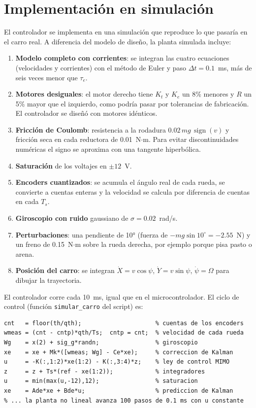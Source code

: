 \documentclass[11pt,letterpaper]{article}
\begin{document}
\section{Implementación en simulación}
\label{sec:implementacion}
El controlador se implementa en una simulación que reproduce lo que pasaría en el carro real. A diferencia del modelo de diseño, la planta simulada incluye:
\begin{enumerate}
  \item \textbf{Modelo completo con corrientes}: se integran las cuatro ecuaciones (velocidades y corrientes) con el método de Euler y paso $\Delta t = 0.1$~ms, más de seis veces menor que $\tau_e$.
  \item \textbf{Motores desiguales}: el motor derecho tiene $K_t$ y $K_e$ un 8\% menores y $R$ un 5\% mayor que el izquierdo, como podría pasar por tolerancias de fabricación. El controlador se diseñó con motores idénticos.
  \item \textbf{Fricción de Coulomb}: resistencia a la rodadura $0.02\,mg\,\operatorname{sign}(v)$ y fricción seca en cada reductora de 0.01~N$\cdot$m. Para evitar discontinuidades numéricas el signo se aproxima con una tangente hiperbólica.
  \item \textbf{Saturación} de los voltajes en $\pm12$~V.
  \item \textbf{Encoders cuantizados}: se acumula el ángulo real de cada rueda, se convierte a cuentas enteras y la velocidad se calcula por diferencia de cuentas en cada $T_s$.
  \item \textbf{Giroscopio con ruido} gaussiano de $\sigma = 0.02$~rad/s.
  \item \textbf{Perturbaciones}: una pendiente de 10° (fuerza de $-mg\sin 10^\circ = -2.55$~N) y un freno de 0.15~N$\cdot$m sobre la rueda derecha, por ejemplo porque pisa pasto o arena.
  \item \textbf{Posición del carro}: se integran $\dot X = v\cos\psi$, $\dot Y = v\sin\psi$, $\dot\psi=\Omega$ para dibujar la trayectoria.
\end{enumerate}

El controlador corre cada 10~ms, igual que en el microcontrolador. El ciclo de control (función \texttt{simular\_carro} del script) es:
\begin{lstlisting}
cnt   = floor(th/qth);                     % cuentas de los encoders
wmeas = (cnt - cntp)*qth/Ts;  cntp = cnt;  % velocidad de cada rueda
Wg    = x(2) + sig_g*randn;                % giroscopio
xe    = xe + Mk*([wmeas; Wg] - Ce*xe);     % correccion de Kalman
u     = -K(:,1:2)*xe(1:2) - K(:,3:4)*z;    % ley de control MIMO
z     = z + Ts*(ref - xe(1:2));            % integradores
u     = min(max(u,-12),12);                % saturacion
xe    = Ade*xe + Bde*u;                    % prediccion de Kalman
% ... la planta no lineal avanza 100 pasos de 0.1 ms con u constante
\end{lstlisting}
\end{document}
